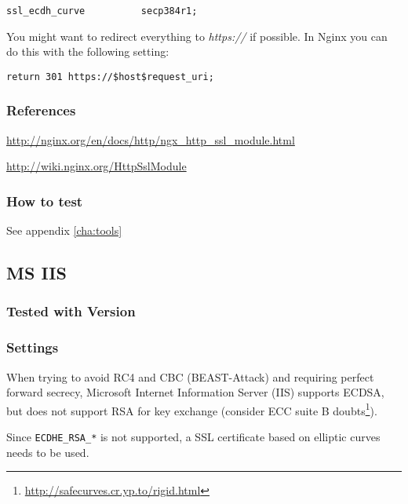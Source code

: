 \begin{lstlisting}
ssl_ecdh_curve          secp384r1;
\end{lstlisting}

You might want to redirect everything to \emph{https://} if possible. In Nginx you can do this with the following setting:

\begin{lstlisting}
return 301 https://$host$request_uri;
\end{lstlisting}

\subsubsection{References} 
\begin{itemize*}
  \item \url{http://nginx.org/en/docs/http/ngx_http_ssl_module.html}
  \item \url{http://wiki.nginx.org/HttpSslModule}
\end{itemize*}

\subsubsection{How to test}
See appendix \ref{cha:tools}


\subsection{MS IIS}
\label{sec:ms-iis}


\subsubsection{Tested with Version} 


\subsubsection{Settings}
When trying to avoid RC4 and CBC (BEAST-Attack) and requiring perfect
forward secrecy, Microsoft Internet Information Server (IIS) supports
ECDSA, but does not support RSA for key exchange (consider ECC suite
B doubts\footnote{\url{http://safecurves.cr.yp.to/rigid.html}}).

Since \verb|ECDHE_RSA_*| is not supported, a SSL certificate based on
elliptic curves needs to be used.

